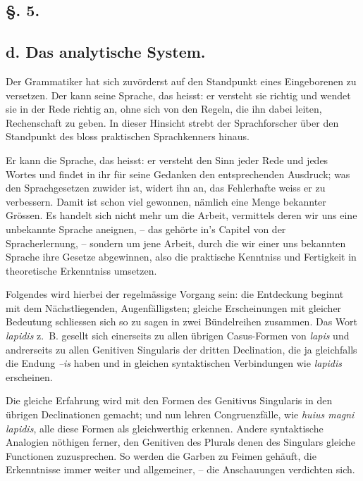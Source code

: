 \clearpage{}
\subsection*{§. 5.}\label{II.VI.5}
\subsection*{d. Das analytische System.}

Der Grammatiker hat sich zuvörderst auf den Standpunkt eines Eingeborenen zu versetzen. Der kann seine Sprache, das heisst: er versteht sie richtig und wendet sie in der Rede richtig an, ohne sich von den Regeln, die ihn dabei leiten, Rechenschaft zu geben. In dieser Hinsicht strebt der Sprachforscher über den Standpunkt des bloss praktischen Sprachkenners hinaus.

\label{sp.89}

Er kann die Sprache, das heisst: er versteht den Sinn jeder Rede und jedes Wortes und findet in ihr für seine Gedanken den entsprechenden Ausdruck; was den Sprachgesetzen zuwider ist, widert ihn an, das Fehlerhafte weiss er zu verbessern. Damit ist schon viel gewonnen, näm\label{fp.91}lich eine Menge bekannter Grössen. Es handelt sich nicht mehr um die Arbeit, vermittels deren wir uns eine unbekannte Sprache aneignen, – das gehörte in’s Capitel von der Spracherlernung, – sondern um jene Arbeit, durch die wir einer uns bekannten Sprache ihre Gesetze abgewinnen, also die praktische Kenntniss und Fertigkeit in theoretische Erkenntniss umsetzen.

Folgendes wird hierbei der regelmässige Vorgang sein: die Entdeckung beginnt mit dem Nächstliegenden, Augenfälligsten; gleiche Erscheinungen mit gleicher Bedeutung schliessen sich so zu sagen in zwei Bündelreihen zusammen. Das Wort \textit{lapidis} z.~B. gesellt sich einerseits zu allen übrigen Casus-Formen von \textit{lapis} und andrerseits zu allen Genitiven Singularis der dritten Declination, die ja gleichfalls die Endung \textit{–is} haben und in gleichen syntaktischen Verbindungen wie \textit{lapidis} erscheinen.

Die gleiche Erfahrung wird mit den Formen des Genitivus Singularis in den übrigen Declinationen gemacht; und nun lehren Congruenzfälle, wie \textit{huius magni lapidis}, alle diese Formen als gleichwerthig erkennen. Andere syntaktische Analogien nöthigen ferner, den Genitiven des Plurals denen des Singulars gleiche Functionen zuzusprechen. So werden die Garben zu Feimen gehäuft, die Erkenntnisse immer weiter und allgemeiner, – die Anschauungen verdichten sich.

